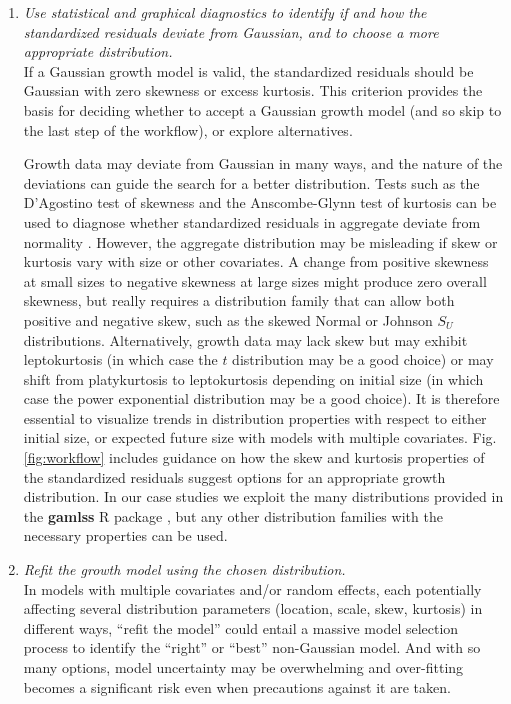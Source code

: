 \documentclass[12pt]{article}
\begin{document}
\begin{enumerate}[label=\arabic*., listparindent=1.5em]
\item \textit{Use statistical and graphical diagnostics to identify if and how the standardized residuals deviate 
from Gaussian, and to choose a more appropriate distribution.}
\\
If a Gaussian growth model is valid, the standardized residuals should be Gaussian with zero skewness or excess kurtosis.  
This criterion provides the basis for deciding whether to accept a Gaussian growth model (and so skip to the
last step of the workflow), or explore alternatives. 

Growth data may deviate from Gaussian in many ways, and the nature of the deviations can guide the search for a better distribution. 
Tests such as the D'Agostino test of skewness \citep{d1970transformation} and the Anscombe-Glynn test of kurtosis \citep{anscombe1983distribution} 
can be used to diagnose whether standardized residuals in aggregate deviate from normality \citep{komsta2015moments}. 
However, the aggregate distribution may be misleading if skew or kurtosis vary with size or other covariates. 
A change from positive skewness at small sizes to negative skewness at large sizes might produce zero overall skewness, but really requires a distribution family that can allow both positive and negative skew, such as the skewed Normal or Johnson $S_{U}$ distributions. 
Alternatively, growth data may lack skew but may exhibit leptokurtosis (in which case the $t$ distribution may be a good choice) or may shift from platykurtosis to leptokurtosis depending on initial size (in which case the power exponential distribution may be a good choice). 
It is therefore essential to visualize trends in distribution properties with respect to either initial size, or expected future size with models with multiple covariates.  
Fig. \ref{fig:workflow} includes guidance on how the skew and kurtosis properties of the standardized residuals suggest options for an appropriate growth distribution. 
In our case studies we exploit the many distributions provided in the \textbf{gamlss} R package \citep{stasinopoulos2007generalized}, but any other distribution families with the necessary properties can be used.  

\item \textit{Refit the growth model using the chosen distribution.}
\\
In models with multiple covariates and/or random effects, each potentially affecting several distribution parameters (location, scale, skew, kurtosis) in different ways, ``refit the model'' could entail a massive model selection process to identify the ``right'' or ``best'' non-Gaussian model. 
And with so many options, model uncertainty may be overwhelming and over-fitting becomes a significant risk even when precautions against it are taken. 


\end{enumerate}
\end{document}
